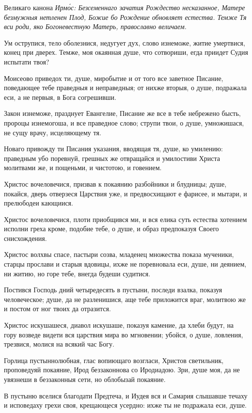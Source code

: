 Великаго канона \itshape Ирм\'{о}с\normalfont{}: Безсеменнаго зачатия Рождество несказанное, Матере безмужныя нетленен Плод, Божие бо Рождение обновляет естества. Темже Тя вси роди, яко Богоневестную Матерь, православно величаем.

Ум острупися, тело оболезнися, недугует дух, слово изнеможе, житие умертвися, конец при дверех. Темже, моя окаянная душе, что сотвориши, егда приидет Судия испытати твоя?

Моисеово приведох ти, душе, миробытие и от того все заветное Писание, поведающее тебе праведныя и неправедныя; от нихже вторыя, о душе, подражала еси, а не первыя, в Бога согрешивши.

Закон изнеможе, празднует Евангелие, Писание же все в тебе небрежено бысть, пророцы изнемогоша, и все праведное слово; струпи твои, о душе, умножишася, не сущу врачу, исцеляющему тя.

Новаго привожду ти Писания указания, вводящая тя, душе, ко умилению: праведным убо поревнуй, грешных же отвращайся и умилостиви Христа молитвами же, и пощеньми, и чистотою, и говением.

Христос вочеловечися, призвав к покаянию разбойники и блудницы; душе, покайся, дверь отверзеся Царствия уже, и предвосхищают е фарисее, и мытари, и прелюбодеи кающиися.

Христос вочеловечися, плоти приобщився ми, и вся елика суть естества хотением исполни греха кроме, подобие тебе, о душе, и образ предпоказуя Своего снисхождения.

Христос волхвы спасе, пастыри созва, младенец множества показа мученики, старцы прослави и старыя вдовицы, ихже не поревновала еси, душе, ни деянием, ни житию, но горе тебе, внегда будеши судитися.

Постився Господь дний четыредесять в пустыни, последи взалка, показуя человеческое; душе, да не разленишися, аще тебе приложится враг, молитвою же и постом от ног твоих да отразится.

Христос искушашеся, диавол искушаше, показуя камение, да хлеби будут, на гору возведе видети вся царствия мира во мгновении; убойся, о душе, ловления, трезвися, молися на всякий час Богу.

Горлица пустыннолюбная, глас вопиющаго возгласи, Христов светильник, проповедуяй покаяние, Ирод беззаконнова со Иродиадою. Зри, душе моя, да не увязнеши в беззаконныя сети, но облобызай покаяние.

В пустыню вселися благодати Предтеча, и Иудея вся и Самария слышавше течаху и исповедаху грехи своя, крещающеся усердно: ихже ты не подражала еси, душе.

